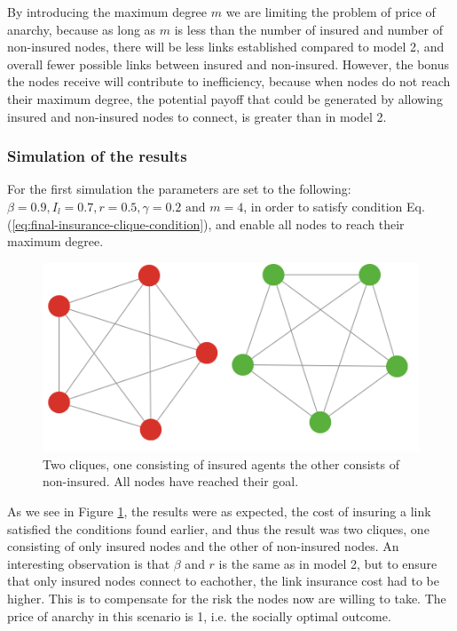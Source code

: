 By introducing the maximum degree $m$ we are limiting the problem of price of anarchy, because as long as $m$ is less than the number of insured and number of non-insured nodes, there will be less links established compared to model 2, and overall fewer possible links between insured and non-insured. However, the bonus the nodes receive will contribute to inefficiency, because when nodes do not reach their maximum degree, the potential payoff that could be generated by allowing insured and non-insured nodes to connect, is greater than in model 2.


\subsubsection{Simulation of the results}
For the first simulation the parameters are set to the following: $\beta=0.9, I_{l}=0.7, r=0.5, \gamma=0.2 \text{ and }m=4$, in order to satisfy condition Eq.(\ref{eq:final-insurance-clique-condition}), and enable all nodes to reach their maximum degree.  

\begin{figure}[h]
\centering
  \includegraphics[width=0.7\linewidth]{../Figures/BonusGameInsuredClique.png}
  \caption{\label{fig:bonusoptimal} Two cliques, one consisting of insured agents the other consists of non-insured. All nodes have reached their goal. }
\end{figure}
As we see in Figure \ref{fig:bonusoptimal}, the results were as expected, the cost of insuring a link satisfied the conditions found earlier, and thus the result was two cliques, one consisting of only insured nodes and the other of non-insured nodes.
An interesting observation is that $\beta$ and $r$ is the same as in model 2, but to ensure that only insured nodes connect to eachother, the link insurance cost had to be higher. This is to compensate for the risk the nodes now are willing to take. The price of anarchy in this scenario is 1, i.e. the socially optimal outcome. 

